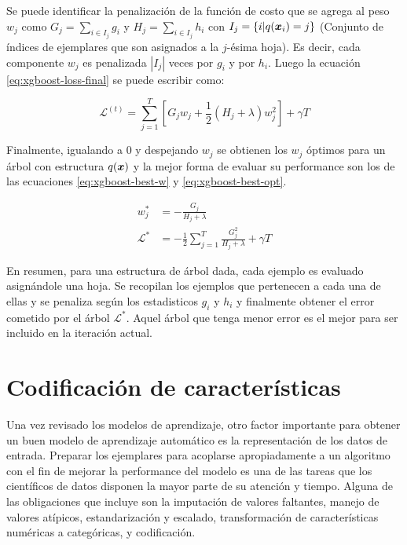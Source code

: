 Se puede identificar la penalización de la función de costo que se agrega al
peso $w_j$ como $G_{j} = \sum_{i \in I_j} g_i$ y $H_j = \sum_{i \in I_j} h_i$
con $I_j = \{i | q(\boldsymbol{x}_i) = j\}$ (Conjunto de índices de ejemplares que son
asignados a la $j$-ésima hoja). Es decir, cada componente $w_j$ es penalizada
$|I_{j}|$ veces por $g_i$ y por $h_i$. Luego la ecuación
\ref{eq:xgboost-loss-final} se puede escribir como:

\begin{equation}
    \mathcal{L}^{(t)} = \sum_{j = 1}^{T}[G_j w_j + \frac{1}{2} (H_j + \lambda)w_j^2] + \gamma T
\end{equation}

Finalmente, igualando a $0$ y despejando $w_j$ se obtienen los $w_j$ óptimos
para un árbol con estructura $q(\boldsymbol{x})$ y la mejor forma de evaluar su
performance son los de las ecuaciones \ref{eq:xgboost-best-w} y
\ref{eq:xgboost-best-opt}.

\begin{align}
    w_{j}^{*} &= - \frac{G_j}{H_j + \lambda} \label{eq:xgboost-best-w}\\
    \mathcal{L}^{*} &= -\frac{1}{2} \sum_{j=1}^{T} \frac{G_{j}^{2}}{H_j + \lambda} + \gamma T \label{eq:xgboost-best-opt}
\end{align}

En resumen, para una estructura de árbol dada, cada ejemplo es evaluado
asignándole una hoja. Se recopilan los ejemplos que pertenecen a cada una de
ellas y se penaliza según los estadisticos $g_i$ y $h_i$ y finalmente obtener el
error cometido por el árbol $\mathcal{L^{*}}$. Aquel árbol que tenga menor error
es el mejor para ser incluido en la iteración actual.

\section{Codificación de características}

Una vez revisado los modelos de aprendizaje, otro factor importante para obtener
un buen modelo de aprendizaje automático es la representación de los datos de
entrada. Preparar los ejemplares para acoplarse apropiadamente a un algoritmo
con el fin de mejorar la performance del modelo es una de las tareas que
los científicos de datos disponen la mayor parte de su atención y tiempo. Alguna
de las obligaciones que incluye son la imputación de valores faltantes, manejo
de valores atípicos, estandarización y escalado, transformación de
características numéricas a categóricas, y codificación.

